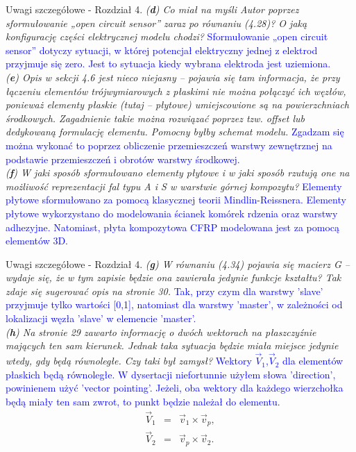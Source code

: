 \documentclass[10pt,aspectratio=169]{beamer} %
\begin{document}
\begin{frame}[label=frame4]{Uwagi szczegółowe - Rozdział 4.}\justifying
\textit{(\textbf{d}) Co miał na myśli Autor poprzez sformułowanie „open circuit sensor” zaraz po równaniu (4.28)? O jaką konfigurację części elektrycznej modelu chodzi?} \textcolor{blue}{Sformułowanie „open circuit sensor” dotyczy sytuacji, w której potencjał elektryczny jednej z elektrod przyjmuje się zero. Jest to sytuacja kiedy wybrana elektroda jest uziemiona.}\\
\textit{(\textbf{e}) Opis w sekcji 4.6 jest nieco niejasny – pojawia się tam informacja, że przy łączeniu elementów trójwymiarowych z płaskimi nie można połączyć ich węzłów, ponieważ elementy płaskie (tutaj – płytowe) umiejscowione są na powierzchniach środkowych. Zagadnienie takie można rozwiązać poprzez tzw. offset lub dedykowaną formulację elementu. Pomocny byłby schemat modelu.} \textcolor{blue}{Zgadzam się można wykonać to poprzez obliczenie przemieszczeń warstwy zewnętrznej na podstawie przemieszczeń i obrotów warstwy środkowej.}\\
\textit{(\textbf{f}) W jaki sposób sformułowano elementy płytowe i w jaki sposób rzutują one na	możliwość reprezentacji fal typu A i S w warstwie górnej kompozytu?} \textcolor{blue}{Elementy płytowe sformułowano za pomocą klasycznej teorii Mindlin-Reissnera. Elementy płytowe wykorzystano do modelowania ścianek komórek rdzenia oraz warstwy adhezyjne. Natomiast, płyta kompozytowa CFRP modelowana jest za pomocą elementów 3D.}
\end{frame}
\begin{frame}[label=frame4]{Uwagi szczegółowe - Rozdział 4.}\justifying
\textit{(\textbf{g}) W równaniu (4.34) pojawia się macierz G – wydaje się, że w tym zapisie będzie ona zawierała jedynie funkcje kształtu? Tak zdaje się sugerować opis na stronie 30.} \textcolor{blue}{Tak, przy czym dla warstwy 'slave' przyjmuje tylko wartości [0,1], natomiast dla warstwy 'master', w zależności od lokalizacji węzła 'slave' w elemencie 'master'.}\\
\textit{(\textbf{h}) Na stronie 29 zawarto informację o dwóch wektorach na płaszczyźnie mających ten sam kierunek. Jednak taka sytuacja będzie miała miejsce jedynie wtedy, gdy będą równoległe. Czy taki był zamysł?} \textcolor{blue}{Wektory \(\vec{V}_1\),\(\vec{V}_2\) dla elementów płaskich będą równoległe. W dysertacji niefortunnie użyłem słowa 'direction', powinienem użyć 'vector pointing'. Jeżeli, oba wektory dla każdego wierzchołka będą miały ten sam zwrot, to punkt będzie należał do elementu.}
\begin{eqnarray}
\vec{V}_1 & = & \vec{v}_1\times \vec{v}_p,\\
\vec{V}_2 & = & \vec{v}_p\times \vec{v}_2.
\end{eqnarray}
\end{frame}
\end{document}
